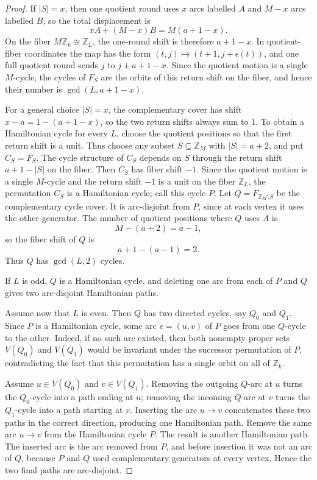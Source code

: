 \documentclass[11pt]{article}
\newcommand{\Z}{\mathbb Z}
\begin{document}
\begin{proof}
If $|S|=x$, then one quotient round uses $x$ arcs labelled $A$ and $M-x$ arcs labelled $B$, so the total displacement is
\[
        xA+(M-x)B=M(a+1-x).
\]
On the fiber $M\Z_k\cong\Z_L$, the one-round shift is therefore $a+1-x$.  In quotient-fiber coordinates the map has the form $(t,j)\mapsto(t+1,j+\epsilon(t))$, and one full quotient round sends $j$ to $j+a+1-x$.  Since the quotient motion is a single $M$-cycle, the cycles of $F_S$ are the orbits of this return shift on the fiber, and hence their number is $\gcd(L,a+1-x)$.

For a general choice $|S|=x$, the complementary cover has shift $x-a=1-(a+1-x)$, so the two return shifts always sum to $1$.  To obtain a Hamiltonian cycle for every $L$, choose the quotient positions so that the first return shift is a unit.  Thus choose any subset $S\subseteq\Z_M$ with $|S|=a+2$, and put $C_S=F_S$.  The cycle structure of $C_S$ depends on $S$ through the return shift $a+1-|S|$ on the fiber.  Then $C_S$ has fiber shift $-1$.  Since the quotient motion is a single $M$-cycle and the return shift $-1$ is a unit on the fiber $\Z_L$, the permutation $C_S$ is a Hamiltonian cycle; call this cycle $P$.  Let $Q=F_{\Z_M\setminus S}$ be the complementary cycle cover.  It is arc-disjoint from $P$, since at each vertex it uses the other generator.  The number of quotient positions where $Q$ uses $A$ is
\[
        M-(a+2)=a-1,
\]
so the fiber shift of $Q$ is
\[
        a+1-(a-1)=2.
\]
Thus $Q$ has $\gcd(L,2)$ cycles.

If $L$ is odd, $Q$ is a Hamiltonian cycle, and deleting one arc from each of $P$ and $Q$ gives two arc-disjoint Hamiltonian paths.

Assume now that $L$ is even.  Then $Q$ has two directed cycles, say $Q_0$ and $Q_1$.  Since $P$ is a Hamiltonian cycle, some arc $e=(u,v)$ of $P$ goes from one $Q$-cycle to the other.  Indeed, if no such arc existed, then both nonempty proper sets $V(Q_0)$ and $V(Q_1)$ would be invariant under the successor permutation of $P$, contradicting the fact that this permutation has a single orbit on all of $\Z_k$.

Assume $u\in V(Q_0)$ and $v\in V(Q_1)$.  Removing the outgoing $Q$-arc at $u$ turns the $Q_0$-cycle into a path ending at $u$; removing the incoming $Q$-arc at $v$ turns the $Q_1$-cycle into a path starting at $v$.  Inserting the arc $u\to v$ concatenates these two paths in the correct direction, producing one Hamiltonian path.  Remove the same arc $u\to v$ from the Hamiltonian cycle $P$.  The result is another Hamiltonian path.  The inserted arc is the arc removed from $P$, and before insertion it was not an arc of $Q$, because $P$ and $Q$ used complementary generators at every vertex.  Hence the two final paths are arc-disjoint.
\end{proof}
\end{document}
